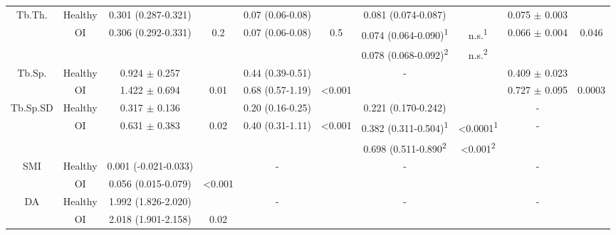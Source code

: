 \documentclass{AR2RC}
\begin{document}
\begin{sidewaystable*}
{\begin{tabular}{cccccccccc}
		\multirow{3}{*}{Tb.Th.} & Healthy & 0.301 (0.287-0.321) & & 0.07 (0.06-0.08) & & 0.081 (0.074-0.087) & & 0.075 $\pm$ 0.003 & \\
		& \multirow{2}{*}{OI} & \multirow{2}{*}{0.306 (0.292-0.331)} & \multirow{2}{*}{0.2} & \multirow{2}{*}{0.07 (0.06-0.08)} & \multirow{2}{*}{0.5} & 0.074 (0.064-0.090)\textsuperscript{1} & n.s.\textsuperscript{1} & \multirow{2}{*}{0.066 $\pm$ 0.004} & \multirow{2}{*}{0.046}\\
		& & & & & & 0.078 (0.068-0.092)\textsuperscript{2} & n.s.\textsuperscript{2} & & \\[3ex]
		
		\multirow{3}{*}{Tb.Sp.} & Healthy & 0.924 $\pm$ 0.257 & & 0.44 (0.39-0.51) & & \multirow{3}{*}{-} & & 0.409 $\pm$ 0.023 & \\
		& \multirow{2}{*}{OI} & \multirow{2}{*}{1.422 $\pm$ 0.694} & \multirow{2}{*}{0.01} & \multirow{2}{*}{0.68 (0.57-1.19)} & \multirow{2}{*}{<0.001} & &  & \multirow{2}{*}{0.727 $\pm$ 0.095} & \multirow{2}{*}{0.0003}\\
		& & & & & & & & & \\[3ex]
		
		\multirow{3}{*}{Tb.Sp.SD} & Healthy & 0.317 $\pm$ 0.136 & & 0.20 (0.16-0.25) & & 0.221 (0.170-0.242) & & - &  \\
		& \multirow{2}{*}{OI} & \multirow{2}{*}{0.631 $\pm$ 0.383} & \multirow{2}{*}{0.02} & \multirow{2}{*}{0.40 (0.31-1.11)} & \multirow{2}{*}{<0.001} & 0.382 (0.311-0.504)\textsuperscript{1} & <0.0001\textsuperscript{1} & - & \\
		& & & & & & 0.698 (0.511-0.890\textsuperscript{2} & <0.001\textsuperscript{2} & & \\[3ex]
		
		\multirow{3}{*}{SMI} & Healthy & 0.001 (-0.021-0.033) & & \multirow{3}{*}{-} &  & \multirow{3}{*}{-} & & \multirow{3}{*}{-} &  \\
		& \multirow{2}{*}{OI} & \multirow{2}{*}{0.056 (0.015-0.079)} & \multirow{2}{*}{<0.001} & & & &  & & \\
		& & & & & & & & & \\[3ex]
		
		\multirow{3}{*}{DA} & Healthy & 1.992 (1.826-2.020) & & \multirow{3}{*}{-} & & \multirow{3}{*}{-} & & \multirow{3}{*}{-} &  \\
		& \multirow{2}{*}{OI} & \multirow{2}{*}{2.018 (1.901-2.158)} & \multirow{2}{*}{0.02} & & & & & & \\
		& & & & & & & & & \\[3ex]
		

\end{tabular}}
\end{sidewaystable*}
\end{document}
